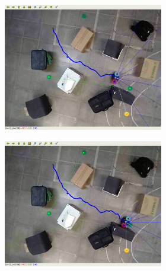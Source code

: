 \begin{figure}[H]
\begin{center}
\begin{subfigure}[b]{0.60\textwidth}
        \begin{subfigure}[b]{0.24\textwidth}
            \includegraphics[width=\textwidth]{imagens/real_envs/real_env2_sac/5.png}
        \end{subfigure}
        \hfill
        \begin{subfigure}[b]{0.24\textwidth}
            \includegraphics[width=\textwidth]{imagens/real_envs/real_env2_sac/6.png}
        \end{subfigure}
        \hfill
        \begin{subfigure}[b]{0.24\textwidth}

\end{subfigure}
\end{subfigure}
\end{center}
\end{figure}
